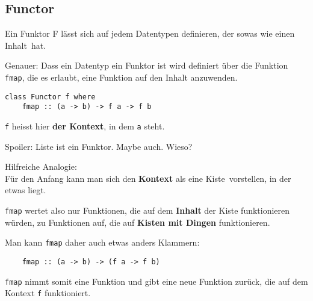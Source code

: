 \documentclass{beamer}
\begin{document}
\subsection{Functor}
\begin{frame}[fragile]
 Ein Funktor F lässt sich auf jedem Datentypen definieren, der sowas wie einen \glqq Inhalt\grqq \ hat.\smallskip
 
 \pause
 Genauer: Dass ein Datentyp ein Funktor ist wird definiert über die Funktion \texttt{fmap}, die es erlaubt, eine Funktion auf den Inhalt anzuwenden. \smallskip
 
 \begin{verbatim}
class Functor f where
    fmap :: (a -> b) -> f a -> f b
 \end{verbatim}
 \smallskip
 
 \texttt{f} heisst hier \textbf{der Kontext}, in dem \texttt{a} steht.\\
\pause
\bigskip

Spoiler: Liste ist ein Funktor. Maybe auch. Wieso?
\end{frame}

\begin{frame}[fragile]
Hilfreiche Analogie:\\
Für den Anfang kann man sich den \textbf{Kontext} als eine \glqq Kiste\grqq \ vorstellen, in der etwas liegt.\\
\bigskip

\pause
\texttt{fmap} wertet also nur Funktionen, die auf dem \textbf{Inhalt} der Kiste funktionieren würden, zu Funktionen auf, die auf \textbf{Kisten mit Dingen} funktionieren.\\\bigskip

\pause
Man kann \texttt{fmap} daher auch etwas anders Klammern:
\begin{verbatim}
    fmap :: (a -> b) -> (f a -> f b)
\end{verbatim}
\texttt{fmap} nimmt somit eine Funktion und gibt eine neue Funktion zurück, die auf dem Kontext \texttt{f} funktioniert.
\end{frame}
\end{document}
